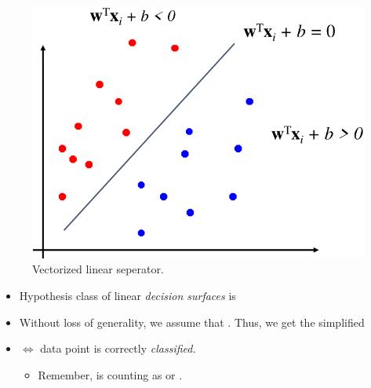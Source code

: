 \documentclass[
	number={2},
	title={Learning Linear Separators{,} SVMs and Kernels}
]{cs584notes}
\begin{document}
\begin{minipage}[m]{0.4\textwidth}
	\begin{figure}[H]
		\centering
		\includegraphics[width=\textwidth]{figures/2/linear_separator_2}
		\caption{Vectorized linear seperator.}
		\label{fig:linear_separator_2}
	\end{figure}
\end{minipage}\hfill%
\begin{minipage}[m]{0.6\textwidth}
	\begin{itemize}
		\item Hypothesis class of linear \emph{decision surfaces} is 
		\item Without loss of generality, we assume that .
		Thus, we get the simplified 
		\item {} $\Leftrightarrow$ data point  is correctly \emph{classified.}
		\begin{itemize}
			\item Remember,  is counting as  or .
		\end{itemize}
	\end{itemize}
\end{minipage}
\end{document}
